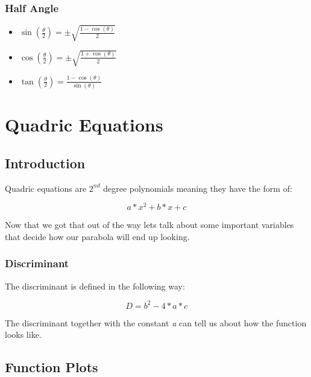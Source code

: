 \documentclass[a4paper, 15pt]{article}
\begin{document}
			\subsubsection{Half Angle}
				\begin{itemize}
					\item $\sin(\frac{\theta}{2}) = \pm \sqrt{\frac{1-\cos(\theta)}{2}}$
					\item $\cos(\frac{\theta}{2}) = \pm  \sqrt{\frac{1+\cos(\theta)}{2}}$
					\item $\tan(\frac{\theta}{2}) = \frac{1-\cos(\theta)}{\sin(\theta)}$
				\end{itemize}	
	\section{Quadric Equations}
		\subsection{Introduction}
			\noindent Quadric equations are $2^{nd}$ degree polynomials meaning they have the form of:
			
			\begin{equation*}
				a*x^2 + b*x + c
			\end{equation*}

			\noindent Now that we got that out of the way lets talk about some important variables that decide how our parabola will end up looking.

			\subsubsection{Discriminant}
				\noindent The discriminant is defined in the following way:
				
				\begin{equation*}
					D = b^2 - 4*a*c
				\end{equation*}

				\noindent The discriminant together with the constant \emph{a} can tell us about how the function looks like.
			
		\subsection{Function Plots}
\end{document}

